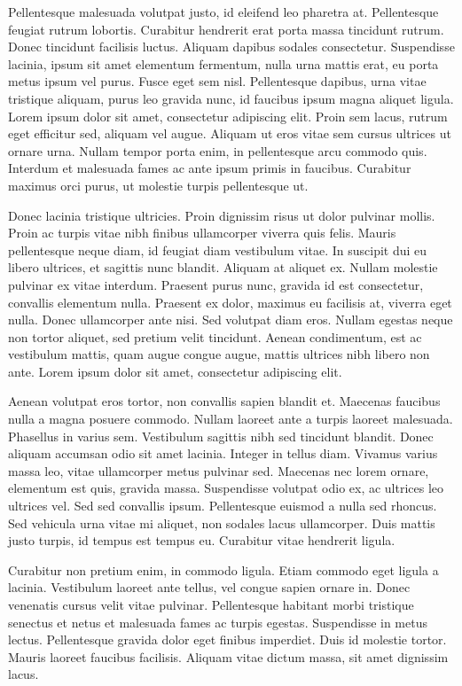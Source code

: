 Pellentesque malesuada volutpat justo, id eleifend leo pharetra at. Pellentesque feugiat rutrum lobortis. Curabitur hendrerit erat porta massa tincidunt rutrum. Donec tincidunt facilisis luctus. Aliquam dapibus sodales consectetur. Suspendisse lacinia, ipsum sit amet elementum fermentum, nulla urna mattis erat, eu porta metus ipsum vel purus. Fusce eget sem nisl. Pellentesque dapibus, urna vitae tristique aliquam, purus leo gravida nunc, id faucibus ipsum magna aliquet ligula. Lorem ipsum dolor sit amet, consectetur adipiscing elit. Proin sem lacus, rutrum eget efficitur sed, aliquam vel augue. Aliquam ut eros vitae sem cursus ultrices ut ornare urna. Nullam tempor porta enim, in pellentesque arcu commodo quis. Interdum et malesuada fames ac ante ipsum primis in faucibus. Curabitur maximus orci purus, ut molestie turpis pellentesque ut.

Donec lacinia tristique ultricies. Proin dignissim risus ut dolor pulvinar mollis. Proin ac turpis vitae nibh finibus ullamcorper viverra quis felis. Mauris pellentesque neque diam, id feugiat diam vestibulum vitae. In suscipit dui eu libero ultrices, et sagittis nunc blandit. Aliquam at aliquet ex. Nullam molestie pulvinar ex vitae interdum. Praesent purus nunc, gravida id est consectetur, convallis elementum nulla. Praesent ex dolor, maximus eu facilisis at, viverra eget nulla. Donec ullamcorper ante nisi. Sed volutpat diam eros. Nullam egestas neque non tortor aliquet, sed pretium velit tincidunt. Aenean condimentum, est ac vestibulum mattis, quam augue congue augue, mattis ultrices nibh libero non ante. Lorem ipsum dolor sit amet, consectetur adipiscing elit.

Aenean volutpat eros tortor, non convallis sapien blandit et. Maecenas faucibus nulla a magna posuere commodo. Nullam laoreet ante a turpis laoreet malesuada. Phasellus in varius sem. Vestibulum sagittis nibh sed tincidunt blandit. Donec aliquam accumsan odio sit amet lacinia. Integer in tellus diam. Vivamus varius massa leo, vitae ullamcorper metus pulvinar sed. Maecenas nec lorem ornare, elementum est quis, gravida massa. Suspendisse volutpat odio ex, ac ultrices leo ultrices vel. Sed sed convallis ipsum. Pellentesque euismod a nulla sed rhoncus. Sed vehicula urna vitae mi aliquet, non sodales lacus ullamcorper. Duis mattis justo turpis, id tempus est tempus eu. Curabitur vitae hendrerit ligula.

Curabitur non pretium enim, in commodo ligula. Etiam commodo eget ligula a lacinia. Vestibulum laoreet ante tellus, vel congue sapien ornare in. Donec venenatis cursus velit vitae pulvinar. Pellentesque habitant morbi tristique senectus et netus et malesuada fames ac turpis egestas. Suspendisse in metus lectus. Pellentesque gravida dolor eget finibus imperdiet. Duis id molestie tortor. Mauris laoreet faucibus facilisis. Aliquam vitae dictum massa, sit amet dignissim lacus.

